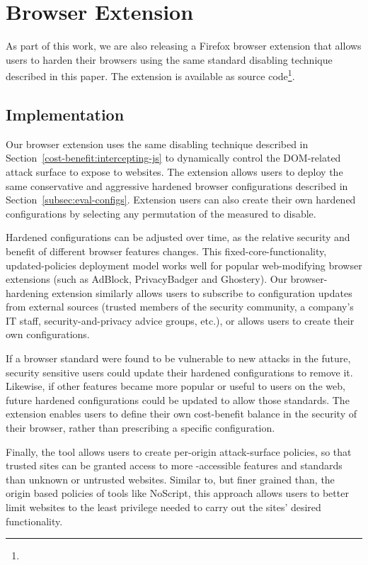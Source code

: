 \section{Browser Extension}
\label{current-web:extension}

As part of this work, we are also releasing a Firefox browser extension
that allows users to harden their browsers using the same standard
disabling technique described in this paper.  The extension is available
as source code\footnote{\ExtensionSourceUrl}.

\subsection{Implementation}
Our browser extension uses the same \WAS disabling technique described in
Section~\ref{cost-benefit:intercepting-js} to dynamically control the DOM-related
attack surface to expose to websites.  The extension allows users to
deploy the same conservative and aggressive hardened browser configurations
described in Section~\ref{subsec:eval-configs}.  Extension users can also
create their own hardened configurations by selecting any permutation of the
\NumStandards measured \WASs to disable.

Hardened configurations can be adjusted over time, as the
relative security and benefit of different browser features changes.  This
fixed-core-functionality, updated-policies deployment model works well
for popular web-modifying browser extensions (such as AdBlock, PrivacyBadger and
Ghostery).  Our browser-hardening extension similarly allows users to subscribe
to configuration updates from external sources (trusted members of the security
community, a company's IT staff, security-and-privacy advice groups, etc.), or
allows users to create their own configurations.

If a browser standard were found to be vulnerable to new attacks in the future,
security sensitive users could update their hardened configurations to remove it.
Likewise, if other features became more popular or useful to users on the web,
future hardened configurations could be updated to allow those standards.
The extension enables users to define their own cost-benefit balance in the security
of their browser, rather than prescribing a specific configuration.

Finally, the tool allows users to create per-origin attack-surface policies,
so that trusted sites can be granted access to more \JS-accessible
features and standards than unknown or untrusted websites.  Similar to, but
finer grained than, the origin based policies of tools like NoScript, this
approach allows users to better limit websites to the least privilege
needed to carry out the sites' desired functionality.

